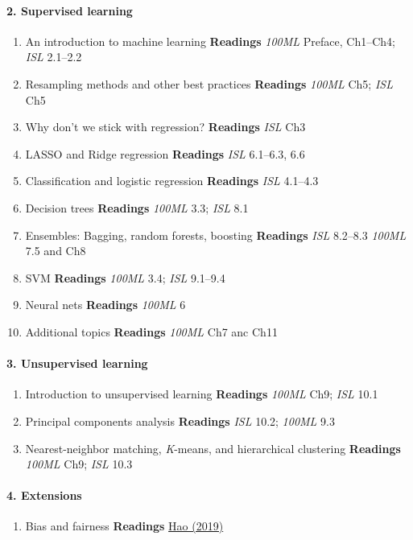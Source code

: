 \documentclass[10pt]{article}
\begin{document}
\paragraph{2. Supervised learning}
\begin{enumerate}
  \item An introduction to machine learning \textbf{Readings} \textit{100ML} Preface, Ch1--Ch4; \textit{ISL} 2.1--2.2
  \item Resampling methods and other best practices \textbf{Readings} \textit{100ML} Ch5; \textit{ISL} Ch5
  \item Why don't we stick with regression? \textbf{Readings} \textit{ISL} Ch3
  \item LASSO and Ridge regression \textbf{Readings} \textit{ISL} 6.1--6.3, 6.6
  \item Classification and logistic regression \textbf{Readings} \textit{ISL} 4.1--4.3
  \item Decision trees \textbf{Readings} \textit{100ML} 3.3; \textit{ISL} 8.1
  \item Ensembles: Bagging, random forests, boosting \textbf{Readings} \textit{ISL} 8.2--8.3 \textit{100ML} 7.5 and Ch8
  \item SVM \textbf{Readings} \textit{100ML} 3.4; \textit{ISL} 9.1--9.4
  \item Neural nets \textbf{Readings} \textit{100ML} 6
  \item Additional topics \textbf{Readings} \textit{100ML} Ch7 anc Ch11
\end{enumerate}

\paragraph{3. Unsupervised learning}
\begin{enumerate}
  \item Introduction to unsupervised learning \textbf{Readings} \textit{100ML} Ch9; \textit{ISL} 10.1
  \item Principal components analysis \textbf{Readings} \textit{ISL} 10.2; \textit{100ML} 9.3
  \item Nearest-neighbor matching, \textit{K}-means, and hierarchical clustering \textbf{Readings} \textit{100ML} Ch9; \textit{ISL} 10.3
\end{enumerate}

\paragraph{4. Extensions}
\begin{enumerate}
  \item Bias and fairness \textbf{Readings} \href{https://www.technologyreview.com/s/612876/this-is-how-ai-bias-really-happensand-why-its-so-hard-to-fix/}{Hao (2019)}
\end{enumerate}
\end{document}
